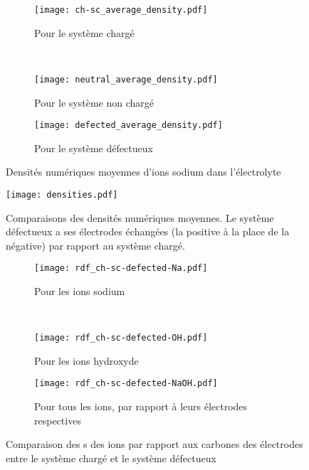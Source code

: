 \begin{figure}[h!]
    \centering
    \begin{subfigure}[t]{.49 \textwidth}
        \centering
        \texttt{[image: ch-sc\_average\_density.pdf]}
        \caption{Pour le système chargé}
    \end{subfigure}%
    ~
    \begin{subfigure}[t]{.49 \textwidth}
        \centering
        \texttt{[image: neutral\_average\_density.pdf]}
        \caption{Pour le système non chargé}
    \end{subfigure}

    \begin{subfigure}[t]{.49 \textwidth}
        \centering
        \texttt{[image: defected\_average\_density.pdf]}
        \caption{Pour le système défectueux}
    \end{subfigure}
    \caption{Densités numériques moyennes d'ions sodium dans l'électrolyte}
    \label{fig:densite}
\end{figure}

\begin{figure}[h!]
    \centering
    \texttt{[image: densities.pdf]}
    \caption{Comparaisons des densités numériques moyennes. Le système défectueux a ses électrodes échangées (la positive à la place de la négative) par rapport au système chargé.}
    \label{fig:comparaison_densite}
\end{figure}

\begin{figure}[h!]
    \centering
    \begin{subfigure}[t]{.49 \textwidth}
        \centering
        \texttt{[image: rdf\_ch-sc-defected-Na.pdf]}
        \caption{Pour les ions sodium}
    \end{subfigure}%
    ~
    \begin{subfigure}[t]{.49 \textwidth}
        \centering
        \texttt{[image: rdf\_ch-sc-defected-OH.pdf]}
        \caption{Pour les ions hydroxyde}
    \end{subfigure}

    \begin{subfigure}[t]{.49 \textwidth}
        \centering
        \texttt{[image: rdf\_ch-sc-defected-NaOH.pdf]}
        \caption{Pour tous les ions, par rapport à leurs électrodes respectives}
    \end{subfigure}
    \caption{Comparaison des \rdf{}s des ions par rapport aux carbones des électrodes entre le système chargé et le système défectueux}
    \label{fig:rdf_ch-sc-defected}
\end{figure}

